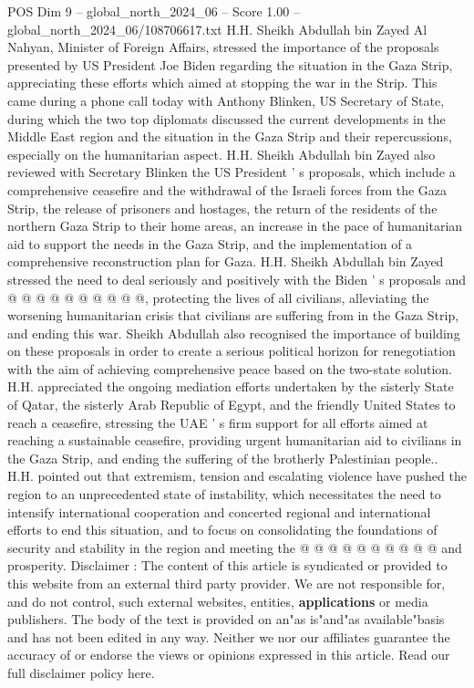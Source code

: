 \begin{textsample}{POS Dim 9 – global\_north\_2024\_06 – Score 1.00 – global\_north\_2024\_06/108706617.txt}  \label{ex:f9_pos_281}
H.H.
Sheikh Abdullah bin Zayed Al Nahyan, Minister of Foreign Affairs, stressed the importance of the proposals presented by US President Joe Biden regarding the situation in the Gaza Strip, appreciating these efforts which aimed at stopping the war in the Strip.
This came during a phone call today with Anthony Blinken, US Secretary of State, during which the two top diplomats discussed the current developments in the Middle East region and the situation in the Gaza Strip and their repercussions, especially on the humanitarian aspect.
H.H.
Sheikh Abdullah bin Zayed also reviewed with Secretary Blinken the US President ' s proposals, which include a comprehensive ceasefire and the withdrawal of the Israeli forces from the Gaza Strip, the release of prisoners and hostages, the return of the residents of the northern Gaza Strip to their home areas, an increase in the pace of humanitarian aid to support the needs in the Gaza Strip, and the implementation of a comprehensive reconstruction plan for Gaza.
H.H.
Sheikh Abdullah bin Zayed stressed the need to deal seriously and positively with the Biden ' s proposals and @ @ @ @ @ @ @ @ @ @, protecting the lives of all civilians, alleviating the worsening humanitarian crisis that civilians are suffering from in the Gaza Strip, and ending this war.
Sheikh Abdullah also recognised the importance of building on these proposals in order to create a serious political horizon for renegotiation with the aim of achieving comprehensive peace based on the two-state solution.
H.H. appreciated the ongoing mediation efforts undertaken by the sisterly State of Qatar, the sisterly Arab Republic of Egypt, and the friendly United States to reach a ceasefire, stressing the UAE ' s firm support for all efforts aimed at reaching a sustainable ceasefire, providing urgent humanitarian aid to civilians in the Gaza Strip, and ending the suffering of the brotherly Palestinian people..
H.H. pointed out that extremism, tension and escalating violence have pushed the region to an unprecedented state of instability, which necessitates the need to intensify international cooperation and concerted regional and international efforts to end this situation, and to focus on consolidating the foundations of security and stability in the region and meeting the @ @ @ @ @ @ @ @ @ @ and prosperity.
Disclaimer : The content of this article is syndicated or provided to this website from an external third party provider.
We are not responsible for, and do not control, such external websites, entities, \textbf{applications} or media publishers.
The body of the text is provided on an"as is"and"as available"basis and has not been edited in any way.
Neither we nor our affiliates guarantee the accuracy of or endorse the views or opinions expressed in this article.
Read our full disclaimer policy here.

\end{textsample}
